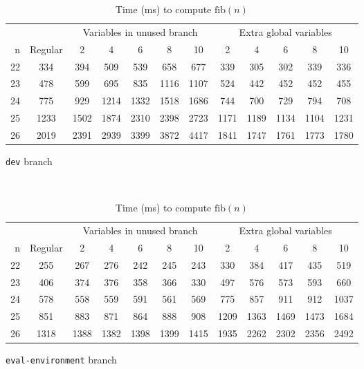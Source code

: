 \begin{singlespace}
  \begin{table}
    \centering
    \begin{subtable}{\textwidth}
      \begin{tabular}{r|c|ccccc|ccccc}
        \hline
        & & \multicolumn{5}{c|}{Variables in unused branch} & \multicolumn{5}{c}{Extra global variables} \\
        n & Regular & 2 & 4 & 6 & 8 & 10 & 2 & 4 & 6 & 8 & 10 \\
        \hline\hline
        22 & 334 & 394 & 509 & 539 & 658 & 677 & 339 & 305 & 302 & 339 & 336 \\
        23 & 478 & 599 & 695 & 835 & 1116 & 1107 & 524 & 442 & 452 & 452 & 455 \\
        24 & 775 & 929 & 1214 & 1332 & 1518 & 1686 & 744 & 700 & 729 & 794 & 708 \\
        25 & 1233 & 1502 & 1874 & 2310 & 2398 & 2723 & 1171 & 1189 & 1134 & 1104 & 1231 \\
        26 & 2019 & 2391 & 2939 & 3399 & 3872 & 4417 & 1841 & 1747 & 1761 & 1773 & 1780 \\
        \hline\hline
      \end{tabular}
      \caption{\texttt{dev} branch}
      \label{tab:perf-fib-dev}
    \end{subtable} \\
    \vspace{1em}
    \begin{subtable}{\textwidth}
      \begin{tabular}{r|c|ccccc|ccccc}
        \hline
        & & \multicolumn{5}{c|}{Variables in unused branch} & \multicolumn{5}{c}{Extra global variables} \\
        n & Regular & 2 & 4 & 6 & 8 & 10 & 2 & 4 & 6 & 8 & 10 \\
        \hline\hline
        22 & 255 & 267 & 276 & 242 & 245 & 243 & 330 & 384 & 417 & 435 & 519 \\
        23 & 406 & 374 & 376 & 358 & 366 & 330 & 497 & 576 & 573 & 593 & 660 \\
        24 & 578 & 558 & 559 & 591 & 561 & 569 & 775 & 857 & 911 & 912 & 1037 \\
        25 & 851 & 883 & 871 & 864 & 888 & 908 & 1209 & 1363 & 1469 & 1473 & 1684 \\
        26 & 1318 & 1388 & 1382 & 1398 & 1399 & 1415 & 1935 & 2262 & 2302 & 2356 & 2492 \\
        \hline\hline
      \end{tabular}
      \caption{\texttt{eval-environment} branch}
      \label{tab:perf-fib-evalenv}
    \end{subtable}

    \caption{Time (ms) to compute $\text{fib}(n)$}
    \label{tab:perf-fib-all}
  \end{table}
\end{singlespace}

